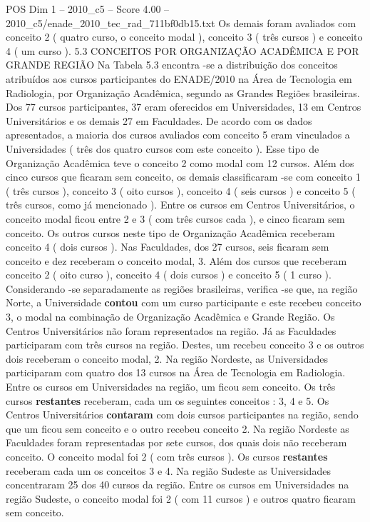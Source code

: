 \begin{textsample}{POS Dim 1 – 2010\_c5 – Score 4.00 – 2010\_c5/enade\_2010\_tec\_rad\_711bf0db15.txt}
Os demais foram avaliados com conceito 2 ( quatro curso, o conceito modal ), conceito 3 ( três cursos ) e conceito 4 ( um curso ). 5.3 CONCEITOS POR ORGANIZAÇÃO ACADÊMICA E POR GRANDE REGIÃO Na Tabela 5.3 encontra -se a distribuição dos conceitos atribuídos aos cursos participantes do ENADE/2010 na Área de Tecnologia em Radiologia, por Organização Acadêmica, segundo as Grandes Regiões brasileiras.
Dos 77 cursos participantes, 37 eram oferecidos em Universidades, 13 em Centros Universitários e os demais 27 em Faculdades.
De acordo com os dados apresentados, a maioria dos cursos avaliados com conceito 5 eram vinculados a Universidades ( três dos quatro cursos com este conceito ).
Esse tipo de Organização Acadêmica teve o conceito 2 como modal com 12 cursos.
Além dos cinco cursos que ficaram sem conceito, os demais classificaram -se com conceito 1 ( três cursos ), conceito 3 ( oito cursos ), conceito 4 ( seis cursos ) e conceito 5 ( três cursos, como já mencionado ).
Entre os cursos em Centros Universitários, o conceito modal ficou entre 2 e 3 ( com três cursos cada ), e cinco ficaram sem conceito.
Os outros cursos neste tipo de Organização Acadêmica receberam conceito 4 ( dois cursos ).
Nas Faculdades, dos 27 cursos, seis ficaram sem conceito e dez receberam o conceito modal, 3.
Além dos cursos que receberam conceito 2 ( oito curso ), conceito 4 ( dois cursos ) e conceito 5 ( 1 curso ).
Considerando -se separadamente as regiões brasileiras, verifica -se que, na região Norte, a Universidade \textbf{contou} com um curso participante e este recebeu conceito 3, o modal na combinação de Organização Acadêmica e Grande Região.
Os Centros Universitários não foram representados na região.
Já as Faculdades participaram com três cursos na região.
Destes, um recebeu conceito 3 e os outros dois receberam o conceito modal, 2.
Na região Nordeste, as Universidades participaram com quatro dos 13 cursos na Área de Tecnologia em Radiologia.
Entre os cursos em Universidades na região, um ficou sem conceito.
Os três cursos \textbf{restantes} receberam, cada um os seguintes conceitos : 3, 4 e 5.
Os Centros Universitários \textbf{contaram} com dois cursos participantes na região, sendo que um ficou sem conceito e o outro recebeu conceito 2.
Na região Nordeste as Faculdades foram representadas por sete cursos, dos quais dois não receberam conceito.
O conceito modal foi 2 ( com três cursos ).
Os cursos \textbf{restantes} receberam cada um os conceitos 3 e 4.
Na região Sudeste as Universidades concentraram 25 dos 40 cursos da região.
Entre os cursos em Universidades na região Sudeste, o conceito modal foi 2 ( com 11 cursos ) e outros quatro ficaram sem conceito.

\end{textsample}
